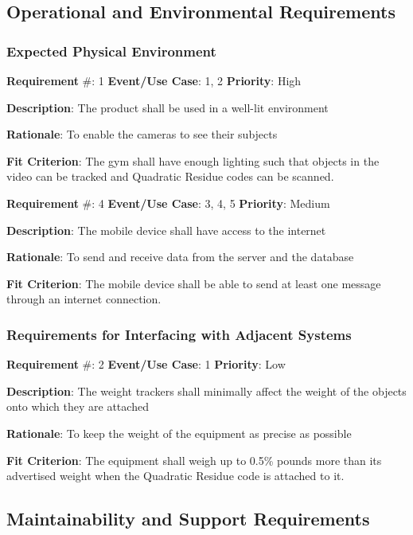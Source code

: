 \documentclass{article}
\newcommand\tab{\hspace*{2cm}}
\begin{document}
\medskip

\subsection{Operational and Environmental Requirements}
\subsubsection{Expected Physical Environment}
\textbf{Requirement} \#: 1 \tab \textbf{Event/Use Case}: 1, 2 \tab \textbf{Priority}: High

\textbf{Description}: The product shall be used in a well-lit environment

\textbf{Rationale}: To enable the cameras to see their subjects

\textbf{Fit Criterion}: The gym shall have enough lighting such that objects in the video can be tracked and Quadratic Residue codes can be scanned.

\medskip

\textbf{Requirement} \#: 4 \tab \textbf{Event/Use Case}: 3, 4, 5 \tab \textbf{Priority}: Medium

\textbf{Description}: The mobile device shall have access to the internet
 
\textbf{Rationale}: To send and receive data from the server and the database

\textbf{Fit Criterion}: The mobile device shall be able to send at least one message through an internet connection.

\medskip

\subsubsection{Requirements for Interfacing with Adjacent Systems}
\textbf{Requirement} \#: 2 \tab \textbf{Event/Use Case}: 1 \tab \textbf{Priority}: Low

\textbf{Description}: The weight trackers shall minimally affect the weight of the objects onto which they are attached

\textbf{Rationale}: To keep the weight of the equipment as precise as possible

\textbf{Fit Criterion}: The equipment shall weigh up to 0.5\% pounds more than its advertised weight when the Quadratic Residue code is attached to it.

\medskip

\subsection{Maintainability and Support Requirements}
\end{document}
